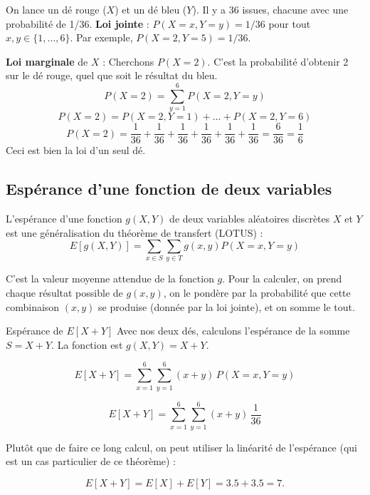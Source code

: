 \begin{examplebox}
On lance un dé rouge ($X$) et un dé bleu ($Y$). Il y a 36 issues, chacune avec une probabilité de 1/36.
\textbf{Loi jointe} : $P(X=x, Y=y) = 1/36$ pour tout $x, y \in \{1, \dots, 6\}$.
Par exemple, $P(X=2, Y=5) = 1/36$.

\textbf{Loi marginale} de $X$ : Cherchons $P(X=2)$. C'est la probabilité d'obtenir 2 sur le dé rouge, quel que soit le résultat du bleu.
$$P(X=2) = \sum_{y=1}^6 P(X=2, Y=y)$$
$$P(X=2) = P(X=2,Y=1) + \dots + P(X=2,Y=6)$$
$$P(X=2) = \frac{1}{36} + \frac{1}{36} + \frac{1}{36} + \frac{1}{36} + \frac{1}{36} + \frac{1}{36} = \frac{6}{36} = \frac{1}{6}$$
Ceci est bien la loi d'un seul dé.
\end{examplebox}

\subsection{Espérance d'une fonction de deux variables}

\begin{definitionbox}
L'espérance d'une fonction $g(X,Y)$ de deux variables aléatoires discrètes $X$ et $Y$ est une généralisation du théorème de transfert (LOTUS) :
$$E[g(X,Y)] = \sum_{x \in S} \sum_{y \in T} g(x,y) P(X=x, Y=y)$$
\end{definitionbox}

\begin{intuitionbox}
C'est la valeur moyenne attendue de la fonction $g$. Pour la calculer, on prend chaque résultat possible de $g(x,y)$, on le pondère par la probabilité que cette combinaison $(x,y)$ se produise (donnée par la loi jointe), et on somme le tout.
\end{intuitionbox}

\begin{examplebox}{Espérance de $E[X+Y]$}
Avec nos deux dés, calculons l'espérance de la somme $S = X + Y$.  
La fonction est $g(X,Y) = X + Y$.

\[
E[X+Y] = \sum_{x=1}^6 \sum_{y=1}^6 (x+y)\, P(X=x, Y=y)
\]

\[
E[X+Y] = \sum_{x=1}^6 \sum_{y=1}^6 (x+y)\, \frac{1}{36}
\]

Plutôt que de faire ce long calcul, on peut utiliser la linéarité de l'espérance (qui est un cas particulier de ce théorème) :

\[
E[X+Y] = E[X] + E[Y] = 3.5 + 3.5 = 7.
\]
\end{examplebox}

